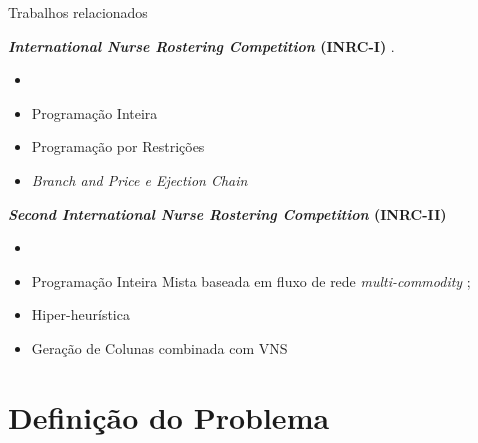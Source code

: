 \documentclass[8pt,mathserif,professionalfont]{beamer}
\begin{document}
\begin{frame}{Trabalhos relacionados}
	
	\textbf{\textit{International Nurse Rostering Competition} (INRC-I)} \citep{haspeslagh2010first}.
		
		\begin{itemize}
			\item {}
			\item Programação Inteira~\citep{valouxis2012systematic}
			\item Programação por Restrições~\citep{nonobe2010}
			\item \textit{Branch and Price e Ejection Chain}~\citep{burke10}
		\end{itemize}
		
		\bigskip
		
	\textbf{\textit{Second International Nurse Rostering Competition} (INRC-II)} \citep{ceschia2015model}
		
		\begin{itemize}
			\item {}
			\item Programação Inteira Mista baseada em fluxo de rede \textit{multi-commodity} \citep{romer2015multi};
			\item Hiper-heurística \citep{kheirisequence}
			\item Geração de Colunas combinada com VNS \citep{gomes2017variable}
			
		\end{itemize}
	
\end{frame}

\section{Definição do Problema}
\end{document}
